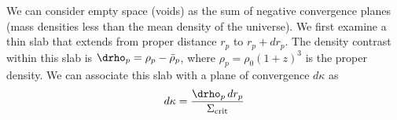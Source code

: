 We can consider empty space (voids) as the sum of negative convergence planes  (mass densities less than the mean density of the universe). We first examine a thin slab that extends from proper distance $r_p$ to $r_p+dr_p$.  The density contrast within this slab is $\drho_p = \rho_p - \bar\rho_p$, where $\rho_p = \rho_0 (1+z)^3$ is the proper density.  We can associate this slab with a plane of convergence $d\kappa$ as
  \begin{equation}
  d\kappa = \frac{\drho_p\,dr_p}{\Sigma_{\rm crit}}
 \end{equation}

  
  
  
  
  